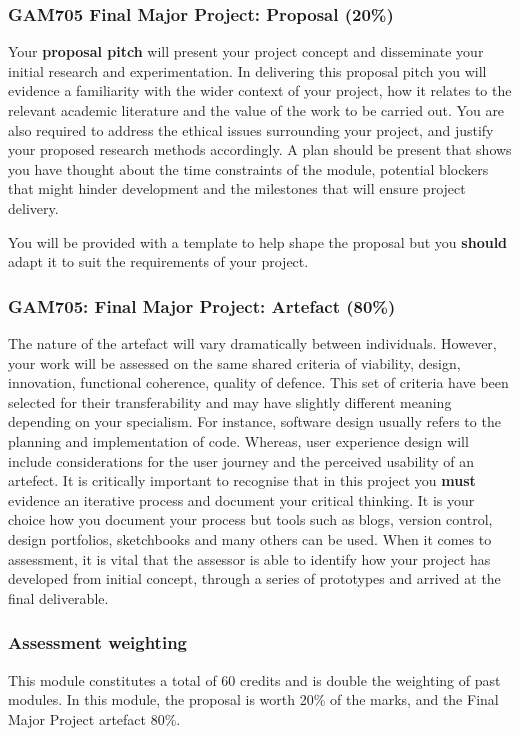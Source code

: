 \subsubsection*{GAM705 Final Major Project: Proposal (20\%)}

Your \textbf{proposal pitch} will present your project concept and disseminate your initial research and experimentation. In delivering this proposal pitch you will evidence a familiarity with the wider context of your project, how it relates to the relevant academic literature and the value of the work to be carried out. You are also required to address the ethical issues surrounding your project, and justify your proposed research methods accordingly. A plan should be present that shows you have thought about the time constraints of the module, potential blockers that might hinder development and the milestones that will ensure project delivery. 

You will be provided with a template to help shape the proposal but you \textbf{should} adapt it to suit the requirements of your project. 

\subsubsection*{GAM705: Final Major Project: Artefact (80\%)}

The nature of the artefact will vary dramatically between individuals. However, your work will be assessed on the same shared criteria of viability, design, innovation, functional coherence, quality of defence. This set of criteria have been selected for their transferability and may have slightly different meaning depending on your specialism. For instance, software design usually refers to the planning and implementation of code. Whereas, user experience design will include considerations for the user journey and the perceived usability of an artefect. It is critically important to recognise that in this project you \textbf{must} evidence an iterative process and document your critical thinking. It is your choice how you document your process but tools such as blogs, version control, design portfolios, sketchbooks and many others can be used. When it comes to assessment, it is vital that the assessor is able to identify how your project has developed from initial concept, through a series of prototypes and arrived at the final deliverable.

\subsubsection*{Assessment weighting}

This module constitutes a total of 60 credits and is double the weighting of past modules. In this module, the proposal is worth 20\% of the marks, and the Final Major Project artefact 80\%. 
